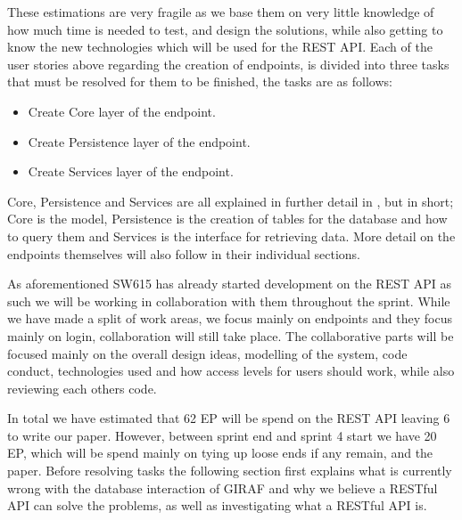 These estimations are very fragile as we base them on very little knowledge of how much time is needed to test, and design the solutions, while also getting to know the new technologies which will be used for the REST API.
Each of the user stories above regarding the creation of endpoints, is divided into three tasks that must be resolved for them to be finished, the tasks are as follows:
\begin{itemize}
    \item Create Core layer of the endpoint.
    \item Create Persistence layer of the endpoint.
    \item Create Services layer of the endpoint.
\end{itemize}
Core, Persistence and Services are all explained in further detail in , but in short; Core is the model, Persistence is the creation of tables for the database and how to query them and Services is the interface for retrieving data.
More detail on the endpoints themselves will also follow in their individual sections.

As aforementioned SW615 has already started development on the REST API as such we will be working in collaboration with them throughout the sprint.
While we have made a split of work areas, we focus mainly on endpoints and they focus mainly on login, collaboration will still take place.
The collaborative parts will be focused mainly on the overall design ideas, modelling of the system, code conduct, technologies used and how access levels for users should work, while also reviewing each others code.

In total we have estimated that 62 EP will be spend on the REST API leaving 6 to write our paper.
However, between sprint end and sprint 4 start we have 20 EP, which will be spend mainly on tying up loose ends if any remain, and the paper.
Before resolving tasks the following section first explains what is currently wrong with the database interaction of GIRAF and why we believe a RESTful API can solve the problems, as well as investigating what a RESTful API is.